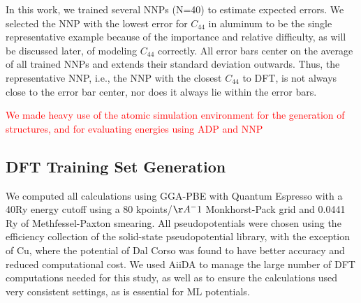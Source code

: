 \documentclass{article}
\begin{document}
In this work, we trained several NNPs (N=40) to estimate expected errors. We selected the NNP with the lowest error for $C_{44}$ in aluminum to be the single representative example because of the importance and relative difficulty, as will be discussed later, of modeling $C_{44}$ correctly. All error bars center on the average of all trained NNPs and extends their standard deviation outwards. Thus, the representative NNP, i.e., the NNP with the closest $C_{44}$ to DFT, is not always close to the error bar center, nor does it always lie within the error bars. 

\textcolor{red}{We made heavy use of the atomic simulation environment for the generation of structures, and for evaluating energies using ADP and NNP \cite{HjorthLarsen2017}}
\subsection{DFT Training Set Generation}
We computed all calculations using GGA-PBE\cite{Perdew1996} with Quantum Espresso\cite{Giannozzi2009} with a 40Ry energy cutoff using a 80 kpoints/$\AA^-1$ Monkhorst-Pack grid\cite{Pack1977SpecialIntegrations} and 0.0441
Ry of Methfessel-Paxton smearing\cite{Methfessel1989High-precisionMetals}.
All pseudopotentials were chosen using the efficiency collection of the solid-state pseudopotential library\cite{Prandini2018}, with the exception of Cu, where the potential of Dal Corso\cite{DalCorso2014}
was found to have better accuracy and reduced computational cost.
We used AiiDA\cite{Pizzi2016} to manage the large number of DFT computations needed for this study, as well as to ensure the calculations used very consistent settings, as is essential for ML potentials\cite{Dragoni2018AchievingIron}.
\end{document}
